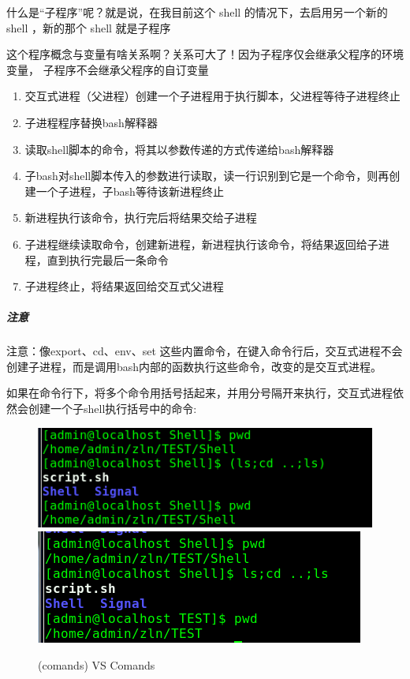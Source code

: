 \documentclass[UTF8,a4paper,12pt]{ctexbook}
\begin{document}
				 什么是“子程序”呢？就是说，在我目前这个 shell 的情况下，去启用另一个新的 shell ，新的那个 shell 就是子程序
				 
				 这个程序概念与变量有啥关系啊？关系可大了！因为子程序仅会继承父程序的环境变量， 子程序不会继承父程序的自订变量
				 \begin{enumerate}
				 	\item 交互式进程（父进程）创建一个子进程用于执行脚本，父进程等待子进程终止
				 	\item 子进程程序替换bash解释器
				 	\item 读取shell脚本的命令，将其以参数传递的方式传递给bash解释器
				 	\item 子bash对shell脚本传入的参数进行读取，读一行识别到它是一个命令，则再创建一个子进程，子bash等待该新进程终止
				 	\item 新进程执行该命令，执行完后将结果交给子进程
				 	\item 子进程继续读取命令，创建新进程，新进程执行该命令，将结果返回给子进程，直到执行完最后一条命令
				 	\item 子进程终止，将结果返回给交互式父进程
				 \end{enumerate}
				 
				 \subparagraph{注意}注意：像export、cd、env、set 这些内置命令，在键入命令行后，交互式进程不会创建子进程，而是调用bash内部的函数执行这些命令，改变的是交互式进程。
				 
				 如果在命令行下，将多个命令用括号括起来，并用分号隔开来执行，交互式进程依然会创建一个子shell执行括号中的命令:
					 \begin{figure}[h]
					 	\begin{center}
						 	\includegraphics[scale = 0.5]{ShellBracket.png}
						 	\includegraphics[scale = 0.5]{ShellBracketNo.png}
						\end{center}
					 	\caption{(comands) VS Comands}
					 \end{figure}
				 
\end{document}
